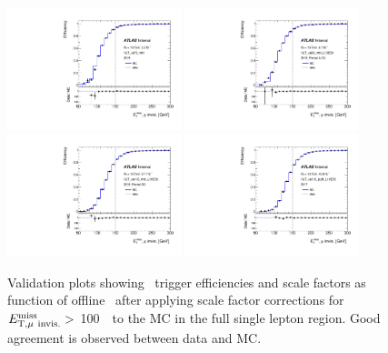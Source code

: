 \begin{figure}[tb!]
	\centering
	\includegraphics[width=0.45\textwidth]{chapters/c6/figures/METTriggerCalibration/validation_HLT_xe70_mht.pdf}
	\includegraphics[width=0.45\textwidth]{chapters/c6/figures/METTriggerCalibration/validation_HLT_xe90_mht_L1XE50.pdf}
	\includegraphics[width=0.45\textwidth]{chapters/c6/figures/METTriggerCalibration/validation_HLT_xe110_mht_L1XE50.pdf}
	\includegraphics[width=0.45\textwidth]{chapters/c6/figures/METTriggerCalibration/validation_HLT_xe110_pufit_L1XE55.pdf}
	\caption{Validation plots showing \MET~trigger efficiencies and scale factors as function of offline \METnomu~after applying scale factor corrections for $E_{\mathrm{T, \mu~invis.}}^{\mathrm{miss}}>$ 100~\GeV~to the MC in the full single lepton region. Good agreement is observed between data and MC.}
	\label{fig:TrigSF_validation}
\end{figure}

